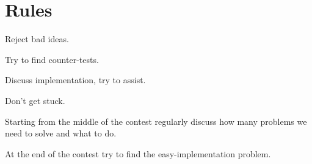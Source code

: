\section{Rules}
Reject bad ideas.

Try to find counter-tests.

Discuss implementation, try to assist.

Don't get stuck.

Starting from the middle of the contest regularly discuss how many problems we need to solve and what to do.

At the end of the contest try to find the easy-implementation problem.
